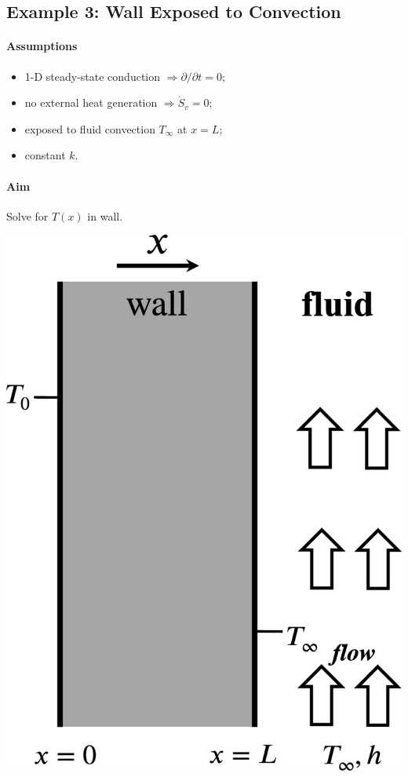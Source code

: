 \documentclass[12pt, a4paper]{article}
\numberwithin{equation}{subsection}
\begin{document}
\subsection{Example 3: Wall Exposed to Convection}
\begin{tcolorbox}[breakable, title = \textbf{Example: Wall Exposed to Convection}]
\begin{minipage}{.6\textwidth}
    \paragraph{Assumptions}
    \begin{itemize}
        \item 1-D steady-state conduction $\Rightarrow \partial / \partial t = 0$;
        \item no external heat generation $ \Rightarrow \dot{S}_{v} = 0$;
        \item exposed to fluid convection $T_{\infty}$ at $x = L$;
        \item constant $k$.
    \end{itemize}
    \paragraph{Aim} Solve for $T(x)$ in wall.
\end{minipage}
\begin{minipage}{.35\textwidth}
    \includegraphics[width=.9\textwidth]{img/conduction_convection.eps}
\end{minipage}


\end{tcolorbox}
\end{document}
